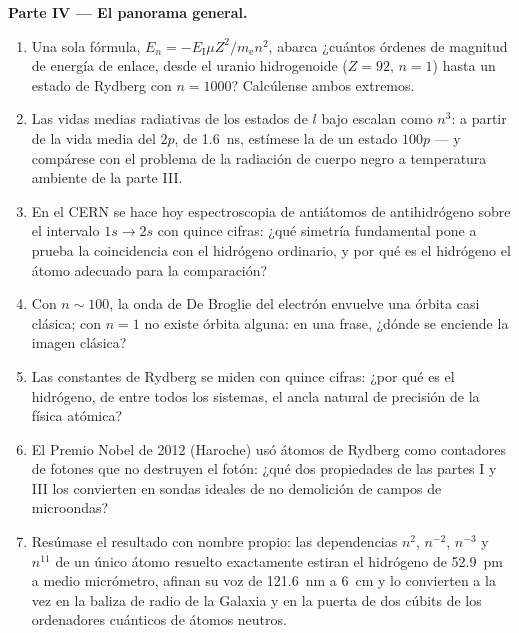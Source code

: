 \begin{problem}
\medskip\noindent\textbf{Parte IV --- El panorama general.}
\begin{enumerate}[resume]
  \item Una sola fórmula, $E_n = -E_{\text{I}}\mu Z^2/m_{\text{e}}n^2$,
        abarca ¿cuántos órdenes de magnitud de energía de enlace, desde
        el uranio hidrogenoide ($Z = 92$, $n = 1$) hasta un
        estado de Rydberg con $n = 1000$? Calcúlense ambos extremos.
  \item Las vidas medias radiativas de los estados de $l$ bajo escalan
        como $n^3$: a partir de la vida media del $2p$, de \qty{1.6}{ns},
        estímese la de un estado $100p$ --- y compárese con el problema de
        la radiación de cuerpo negro a temperatura ambiente de la parte
        III.
  \item En el CERN se hace hoy espectroscopia de antiátomos de
        antihidrógeno sobre el intervalo $1s \to 2s$ con quince cifras:
        ¿qué simetría fundamental pone a prueba la coincidencia con el
        hidrógeno ordinario, y por qué es el hidrógeno el átomo adecuado
        para la comparación?
  \item Con $n \sim 100$, la onda de De Broglie del electrón envuelve una
        órbita casi clásica; con $n = 1$ no existe órbita alguna:
        en una frase, ¿dónde se enciende la imagen clásica?
  \item Las constantes de Rydberg se miden con quince cifras: ¿por qué es
        el hidrógeno, de entre todos los sistemas, el ancla natural de
        precisión de la física atómica?
  \item El Premio Nobel de 2012 (Haroche) usó átomos de Rydberg como
        contadores de fotones que no destruyen el fotón: ¿qué dos
        propiedades de las partes I y III los convierten en sondas ideales
        de no demolición de campos de microondas?
  \item Resúmase el resultado con nombre propio: las dependencias $n^2$,
        $n^{-2}$, $n^{-3}$ y $n^{11}$ de un único átomo resuelto
        exactamente estiran el hidrógeno de \qty{52.9}{pm} a medio
        micrómetro, afinan su voz de \qty{121.6}{nm} a \qty{6}{cm} y lo
        convierten a la vez en la baliza de radio de la Galaxia y en la
        puerta de dos cúbits de los ordenadores cuánticos de átomos
        neutros.
\end{enumerate}
\end{problem}
